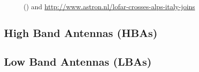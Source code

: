 \begin{figure}[H]
    \centering
    \qquad
    \caption{ (\citet{van2013lofar}) and \url{http://www.astron.nl/lofar-crosses-alps-italy-joins}}%
    \label{fig:example1}%
\end{figure}


\subsection*{High Band Antennas (HBAs)}

\subsection*{Low Band Antennas (LBAs)}



